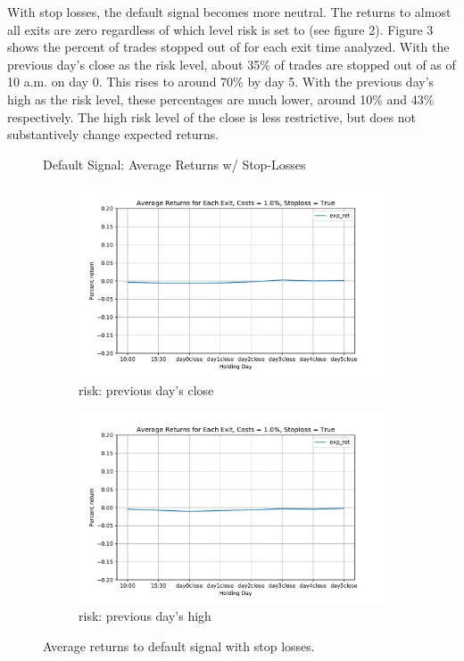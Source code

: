 \documentclass{article}
\begin{document}
With stop losses, the default signal becomes more neutral. The returns to almost all exits are zero regardless of which level risk is set to (see figure 2). Figure 3 shows the percent of trades stopped out of for each exit time analyzed. With the previous day's close as the risk level, about 35\% of trades are stopped out of as of 10 a.m. on day 0. This rises to around 70\% by day 5. With the previous day's high as the risk level, these percentages are much lower, around 10\% and 43\% respectively. The high risk level of the close is less restrictive, but does not substantively change expected returns.

\begin{figure}
\centering
Default Signal: Average Returns w/ Stop-Losses
\begin{subfigure}{\linewidth}
  \centering
  \includegraphics[width=\linewidth]{avg_ret_risk_close.pdf}
  \caption{risk: previous day's close}
\end{subfigure}
\begin{subfigure}{\linewidth}
  \centering
  \includegraphics[width=\linewidth]{avg_ret_risk_high.pdf}
  \caption{risk: previous day's high}
\end{subfigure}
\caption{Average returns to default signal with stop losses.}
\end{figure}
\end{document}
